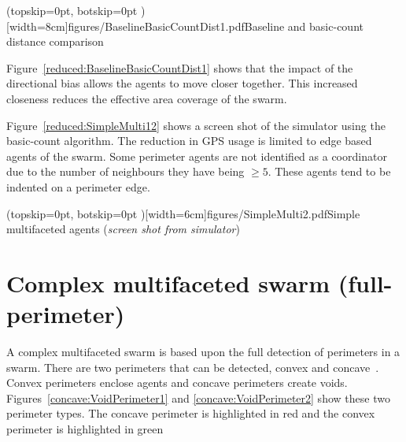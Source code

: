 \documentclass{ieeeaccess}
\begin{document}
\Figure[t!](topskip=0pt, botskip=0pt )[width=8cm]{figures/BaselineBasicCountDist1.pdf}{Baseline and basic-count distance comparison\label{reduced:BaselineBasicCountDist1}}

Figure~\ref{reduced:BaselineBasicCountDist1} shows that the impact of the directional bias allows the agents to move closer together. This increased closeness reduces the effective area coverage of the swarm. 

Figure~\ref{reduced:SimpleMulti12} shows a screen shot of the simulator using the basic-count algorithm. The reduction in GPS usage is limited to edge based agents of the swarm. Some perimeter agents are not identified as a coordinator due to the number of neighbours they have being $\geq5$. These agents tend to be indented on a perimeter edge.


\Figure[t!](topskip=0pt, botskip=0pt )[width=6cm]{figures/SimpleMulti2.pdf}{Simple multifaceted agents (\textit{screen shot from simulator})\label{reduced:SimpleMulti12}}

\section{Complex multifaceted swarm (full-perimeter)}\label{sec:complexMulti} 
A complex multifaceted swarm is based upon the full detection of perimeters in a swarm. There are two perimeters that can be detected, convex and concave~\cite{MD:09,MJ:08}. Convex perimeters enclose agents and concave perimeters create voids. Figures~\ref{concave:VoidPerimeter1} and \ref{concave:VoidPerimeter2} show these two perimeter types. The concave perimeter is highlighted in red and the convex perimeter is highlighted in green

\end{document}
